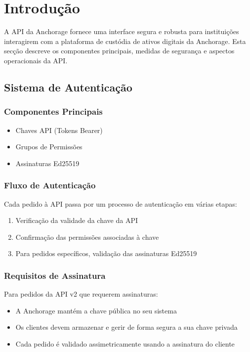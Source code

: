 \newpage
\section{Introdução}
A API da Anchorage fornece uma interface segura e robusta para instituições interagirem com a plataforma de custódia de ativos digitais da Anchorage. Esta secção descreve os componentes principais, medidas de segurança e aspectos operacionais da API.

\subsection{Sistema de Autenticação}
\subsubsection{Componentes Principais}
\begin{itemize}
\item Chaves API (Tokens Bearer)
\item Grupos de Permissões
\item Assinaturas Ed25519
\end{itemize}

\subsubsection{Fluxo de Autenticação}
Cada pedido à API passa por um processo de autenticação em várias etapas:
\begin{enumerate}
\item Verificação da validade da chave da API
\item Confirmação das permissões associadas à chave
\item Para pedidos específicos, validação das assinaturas Ed25519
\end{enumerate}

\subsubsection{Requisitos de Assinatura}
Para pedidos da API v2 que requerem assinaturas:
\begin{itemize}
\item A Anchorage mantém a chave pública no seu sistema
\item Os clientes devem armazenar e gerir de forma segura a sua chave privada
\item Cada pedido é validado assimetricamente usando a assinatura do cliente
\end{itemize}

